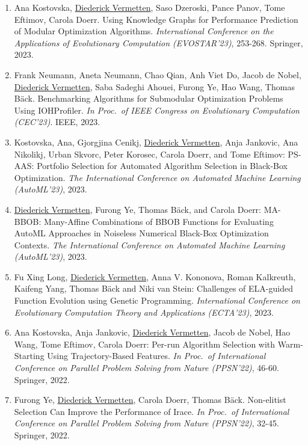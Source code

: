 \begin{enumerate}
    \item Ana Kostovska, \underline{Diederick Vermetten}, Saso Dzeroski, Pance Panov, Tome Eftimov, Carola Doerr. Using Knowledge Graphs for Performance Prediction of Modular Optimization Algorithms. 
    \emph{International Conference on the Applications of Evolutionary Computation (EVOSTAR'23)}, 253-268. Springer, 2023.

    \item Frank Neumann, Aneta Neumann, Chao Qian, Anh Viet Do, Jacob de Nobel, \underline{Diederick Vermetten}, Saba Sadeghi Ahouei, Furong Ye, Hao Wang, Thomas Bäck. Benchmarking Algorithms for Submodular Optimization Problems Using IOHProfiler. 
    \emph{In Proc.~of  IEEE Congress on Evolutionary Computation (CEC'23)}. IEEE, 2023.

    \item Kostovska, Ana, Gjorgjina Cenikj, \underline{Diederick Vermetten}, Anja Jankovic, Ana Nikolikj, Urban Skvorc, Peter Korosec, Carola Doerr, and Tome Eftimov: PS-AAS: Portfolio Selection for Automated Algorithm Selection in Black-Box Optimization.
    \emph{The International Conference on Automated Machine Learning (AutoML'23)}, 2023.

    \item \underline{Diederick Vermetten}, Furong Ye, Thomas Bäck, and Carola Doerr: MA-BBOB: Many-Affine Combinations of BBOB Functions for Evaluating AutoML Approaches in Noiseless Numerical Black-Box Optimization Contexts.
    \emph{The International Conference on Automated Machine Learning (AutoML'23)}, 2023.
        
    \item Fu Xing Long, \underline{Diederick Vermetten}, Anna V. Kononova, Roman Kalkreuth, Kaifeng Yang, Thomas Bäck and Niki van Stein: Challenges of ELA-guided Function Evolution using Genetic Programming.
    \emph{International Conference on Evolutionary Computation Theory and Applications (ECTA'23)}, 2023.

    \item Ana Kostovska, Anja Jankovic, \underline{Diederick Vermetten}, Jacob de Nobel, Hao Wang, Tome Eftimov, Carola Doerr:
        Per-run Algorithm Selection with Warm-Starting Using Trajectory-Based Features.
    \emph{In Proc.~of International Conference on Parallel Problem Solving from Nature (PPSN'22)}, 46-60. Springer, 2022.
    
        \item 	Furong Ye, \underline{Diederick Vermetten}, Carola Doerr, Thomas Bäck. Non-elitist Selection Can Improve the Performance of Irace.
    \emph{In Proc.~of International Conference on Parallel Problem Solving from Nature (PPSN'22)}, 32-45. Springer, 2022.



\end{enumerate}
